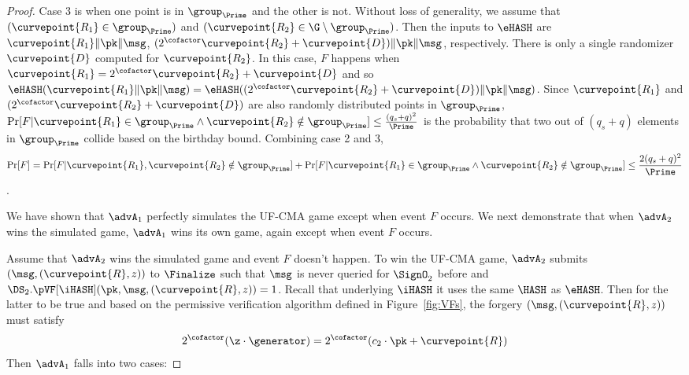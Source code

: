 \begin{proof}
	Case 3 is when one point is in $\group_{\Prime}$ and the other is not. Without loss of generality, we assume that $(\curvepoint{R_1} \in \group_{\Prime})$ and $(\curvepoint{R_2} \in \G \setminus \group_{\Prime})$. Then the inputs to $\eHASH$ are $\curvepoint{R_1}\|\pk\|\msg$, 
	$(2^\cofactor\curvepoint{R_2} + \curvepoint{D})\|\pk\|\msg$, respectively.
	There is only a single randomizer $\curvepoint{D}$ computed for $\curvepoint{R_2}$. In this case, $F$ happens when $\curvepoint{R_1} = 2^\cofactor \curvepoint{R_2} + \curvepoint{D}$ and so $\eHASH(\curvepoint{R_1}\|\pk\| \msg) =  \eHASH((2^\cofactor\curvepoint{R_2} + \curvepoint{D}) \|\pk\| \msg)$. Since $\curvepoint{R_1}$ and $(2^\cofactor\curvepoint{R_2} + \curvepoint{D})$ are also randomly distributed points in $\group_{\Prime}$, $\Pr[F | \curvepoint{R_1} \in \group_{\Prime} \wedge \curvepoint{R_2} \notin \group_{\Prime}] \leq \frac{(q_s + q)^2}{\Prime}$ is the probability that two out of $(q_s + q)$ elements in $\group_{\Prime}$ collide based on the birthday bound. Combining case 2 and 3, 
	\[\Pr[F] = \Pr[F | \curvepoint{R_1}, \curvepoint{R_2} \notin \group_{\Prime}] + \Pr[F | \curvepoint{R_1} \in \group_{\Prime} \wedge \curvepoint{R_2} \notin \group_{\Prime}] \leq \frac{2(q_s + q)^2}{\Prime}\].
	
	We have shown that $\advA_1$ perfectly simulates the UF-CMA game except when event $F$ occurs. We next demonstrate that when $\advA_2$ wins the simulated game, $\advA_1$ wins its own game, again except when event $F$ occurs. 
	
	Assume that $\advA_2$ wins the simulated game and event $F$ doesn't happen. To win the UF-CMA game, $\advA_2$ submits $(\msg, (\curvepoint{R}, z))$ to $\Finalize$ such that $\msg$ is never queried for $\SignO_2$ before and $\DS_2.\pVF[\iHASH](\pk, \msg, (\curvepoint{R}, z)) = 1$. Recall that underlying $\iHASH$ it uses the same $\HASH$ as $\eHASH$. Then for the latter to be true and based on the permissive verification algorithm defined in Figure~\ref{fig:VFs}, the forgery $(\msg, (\curvepoint{R}, z))$ must satisfy 
	\begin{equation}
	2^\cofactor(\z \cdot  \generator) = 2^\cofactor (c_2 \cdot \pk + \curvepoint{R}) \label{eq:5}
	\end{equation}
	Then $\advA_1$ falls into two cases:
	

\end{proof}
